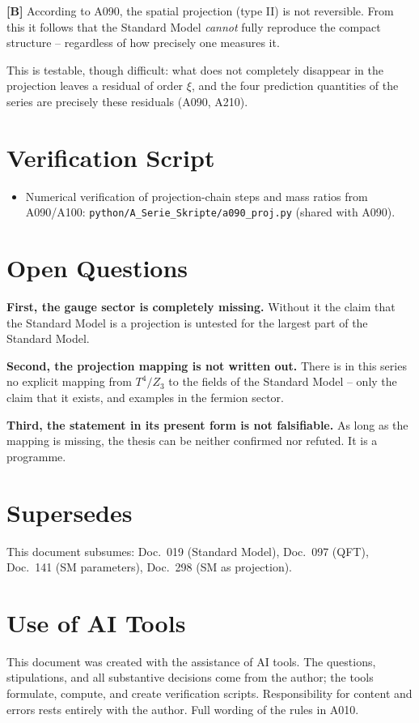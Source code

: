 \textbf{[B]} According to A090, the spatial projection (type II) is not
reversible. From this it follows that the Standard Model \emph{cannot} fully
reproduce the compact structure -- regardless of how precisely one measures it.

This is testable, though difficult: what does not completely disappear in the
projection leaves a residual of order $\xi$, and the four prediction quantities
of the series are precisely these residuals (A090, A210).

\section{Verification Script}

\begin{itemize}[leftmargin=2em,itemsep=2pt,topsep=2pt]
  \item Numerical verification of projection-chain steps and mass ratios from
    A090/A100:
    \texttt{python/A\_Serie\_Skripte/a090\_proj.py} (shared with A090).
\end{itemize}

\section{Open Questions}

\textbf{First, the gauge sector is completely missing.} Without it the claim that
the Standard Model is a projection is untested for the largest part of the
Standard Model.

\textbf{Second, the projection mapping is not written out.} There is in this
series no explicit mapping from $T^4/Z_3$ to the fields of the Standard Model --
only the claim that it exists, and examples in the fermion sector.

\textbf{Third, the statement in its present form is not falsifiable.} As long as
the mapping is missing, the thesis can be neither confirmed nor refuted. It is a
programme.

\section{Supersedes}

This document subsumes: Doc.~019 (Standard Model), Doc.~097 (QFT), Doc.~141
(SM parameters), Doc.~298 (SM as projection).

\section{Use of AI Tools}

This document was created with the assistance of AI tools. The questions,
stipulations, and all substantive decisions come from the author; the tools
formulate, compute, and create verification scripts.
Responsibility for content and errors rests entirely with the author.
Full wording of the rules in A010.
